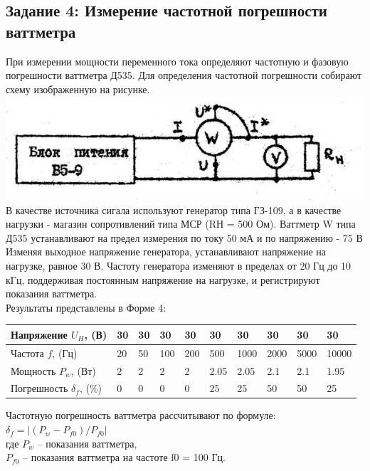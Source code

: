 \newpage

\subsection*{Задание 4: Измерение частотной погрешности ваттметра} 


	При измерении мощности переменного тока определяют частотную и фазовую погрешности 			ваттметра Д535. Для определения частотной погрешности собирают схему изображенную на 	рисунке. \\
	\vspace{1.5cm}
 	\includegraphics[width=\textwidth]{ch4.png}\\
 	
 	В качестве источника сигала используют генератор типа ГЗ-109, а в качестве нагрузки 		- магазин сопротивлений типа МСР (RН = 500 Ом). Ваттметр W типа Д535 устанавливают 			на предел измерения по току 50 мА и по напряжению - 75 В Изменяя выходное напряжение 	генератора, устанавливают напряжение на нагрузке, равное 30 В. Частоту генератора			изменяют в пределах от 20 Гц до 10 кГц, поддерживая постоянным напряжение на 				нагрузке, и регистрируют показания ваттметра.  \\
 	Результаты представлены в Форме 4:\\
 	
 	
 	\begin{table} [h!]
 	 \begin{tabular}{|p{4cm}|p{1cm}|p{1cm}|p{1cm}|p{1cm}|p{1cm}|p{1.2cm}|						p{1.2cm}|p{1.2cm}|p{1.2cm}|}
 	\hline
 	Напряжение $U_{H}$, (В) & 30 & 30 & 30 & 30 & 30 & 30 & 30 & 30 & 30 \\
 	\hline
 	Частота $f$, (Гц) & 20 & 50 & 100 & 200 & 500 & 1000 & 2000 & 5000 & 10000 \\
 	\hline
 	Мощность $P_{w}$, (Вт) & 2 & 2 & 2 & 2 & 2.05 & 2.05 & 2.1 & 2.1 & 1.95 \\
 	\hline
 	Погрешность $\delta _{f}$, (\%) & 0 & 0 & 0 & 0 & 25 & 25 & 50 & 50 & 25 \\
 	\hline
 	\end{tabular}
 	\end{table}
 	
 	
 	\vspace{1cm}
 	Частотную погрешность ваттметра рассчитывают по формуле:\\
 	$ \delta _{f} = |(P_{w} - P_{f0}) / P_{f0}| $ \\
 	где $P_{w}$ – показания ваттметра,\\
 	$P_{f0}$ – показания ваттметра на частоте f0 = 100 Гц.\\
 	
 	
  
  